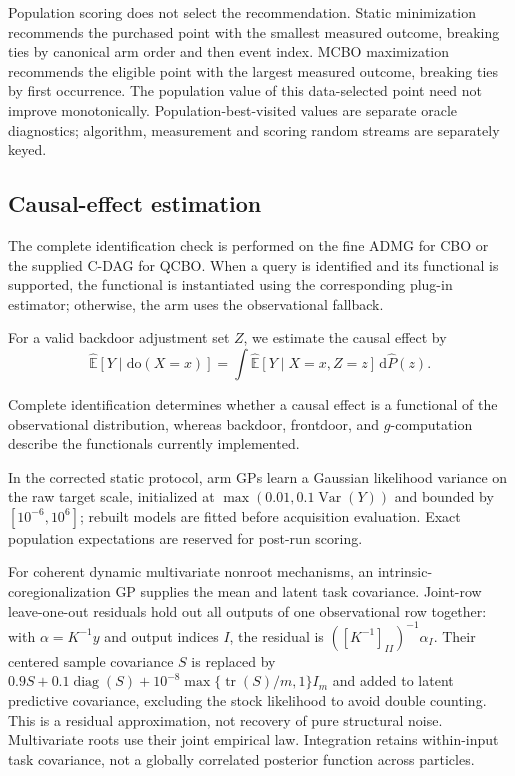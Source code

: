 \documentclass[twoside]{article}
\newcommand{\E}{\mathbb{E}}
\newcommand{\doo}{\mathrm{do}}
\begin{document}
Population scoring does not select the recommendation. Static minimization recommends the purchased point with the smallest measured outcome, breaking ties by canonical arm order and then event index. MCBO maximization recommends the eligible point with the largest measured outcome, breaking ties by first occurrence. The population value of this data-selected point need not improve monotonically. Population-best-visited values are separate oracle diagnostics; algorithm, measurement and scoring random streams are separately keyed.


\subsection{Causal-effect estimation}

The complete identification check is performed on the fine ADMG for CBO or the supplied C-DAG for QCBO. When a query is identified and its functional is supported, the functional is instantiated using the corresponding plug-in estimator; otherwise, the arm uses the observational fallback.

For a valid backdoor adjustment set \(Z\), we estimate the causal effect by
\[
\widehat{\E}[Y\mid\doo(X=x)]
=
\int
\widehat{\E}[Y\mid X=x,Z=z]\,
\mathrm d\widehat P(z).
\]
 
Complete identification determines whether a causal effect is a functional of the observational distribution, whereas backdoor, frontdoor, and $g$-computation describe the functionals currently implemented.

In the corrected static protocol, arm GPs learn a Gaussian likelihood variance on the raw target scale, initialized at $\max(0.01,0.1\operatorname{Var}(Y))$ and bounded by $[10^{-6},10^6]$; rebuilt models are fitted before acquisition evaluation. Exact population expectations are reserved for post-run scoring.

For coherent dynamic multivariate nonroot mechanisms, an intrinsic-coregionalization GP supplies the mean and latent task covariance. Joint-row leave-one-out residuals hold out all outputs of one observational row together: with $\alpha=K^{-1}y$ and output indices $I$, the residual is $([K^{-1}]_{II})^{-1}\alpha_I$. Their centered sample covariance $S$ is replaced by $0.9S+0.1\operatorname{diag}(S)+10^{-8}\max\{\operatorname{tr}(S)/m,1\}I_m$ and added to latent predictive covariance, excluding the stock likelihood to avoid double counting. This is a residual approximation, not recovery of pure structural noise. Multivariate roots use their joint empirical law. Integration retains within-input task covariance, not a globally correlated posterior function across particles.
\end{document}
